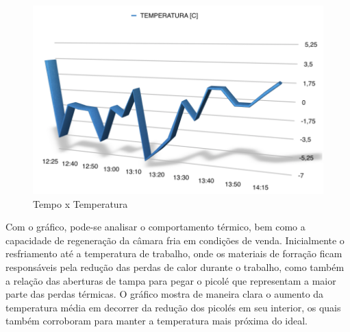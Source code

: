 \begin{apendicesenv}
        \begin{figure}[H]
	\centering
    \includegraphics[width=\textwidth]{figuras/temperatura}
    \caption{Tempo x Temperatura}
    \label{fig:temperatura}
\end{figure}
	Com o gráfico, pode-se analisar o comportamento térmico, bem como a capacidade de regeneração da câmara fria em condições de venda. Inicialmente o resfriamento até a temperatura de trabalho, onde os materiais de forração ficam responsáveis pela redução das perdas de calor durante o trabalho, como também a relação das aberturas de tampa para pegar o picolé que representam a maior parte das perdas térmicas. O gráfico mostra de maneira clara o aumento da temperatura média em decorrer da redução dos picolés em seu interior, os quais também corroboram para manter a temperatura mais próxima do ideal.
	
      


\end{apendicesenv}
